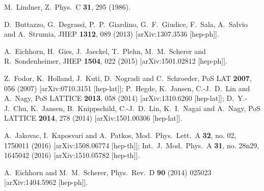 \documentclass[aps,prd,11pt,tightenlines,superscriptaddress,nofootinbib,preprintnumbers,notitlepage]{revtex4-1}
\begin{document}
\begin{thebibliography}{99}
  M.~Lindner,
  Z.\ Phys.\ C {\bf 31}, 295 (1986).

  D.~Buttazzo, G.~Degrassi, P.~P.~Giardino, G.~F.~Giudice, F.~Sala, A.~Salvio and A.~Strumia,
  JHEP {\bf 1312}, 089 (2013)
  [arXiv:1307.3536 [hep-ph]].

  A.~Eichhorn, H.~Gies, J.~Jaeckel, T.~Plehn, M.~M.~Scherer and R.~Sondenheimer,
  JHEP {\bf 1504}, 022 (2015)
  [arXiv:1501.02812 [hep-ph]].

  Z.~Fodor, K.~Holland, J.~Kuti, D.~Nogradi and C.~Schroeder,
  PoS LAT {\bf 2007}, 056 (2007)
  [arXiv:0710.3151 [hep-lat]];
  P.~Hegde, K.~Jansen, C.-J.~D.~Lin and A.~Nagy,
  PoS LATTICE {\bf 2013}, 058 (2014)
  [arXiv:1310.6260 [hep-lat]];
  D.~Y.-J.~Chu, K.~Jansen, B.~Knippschild, C.-J.~D.~Lin, K.~I.~Nagai and A.~Nagy,
  PoS LATTICE {\bf 2014}, 278 (2014)
  [arXiv:1501.00306 [hep-lat]].
  
  A.~Jakovac, I.~Kaposvari and A.~Patkos,
  Mod.\ Phys.\ Lett.\ A {\bf 32}, no. 02, 1750011 (2016)
  [arXiv:1508.06774 [hep-th]]; %
  Int.\ J.\ Mod.\ Phys.\ A {\bf 31}, no. 28n29, 1645042 (2016)
  [arXiv:1510.05782 [hep-th]].

  A.~Eichhorn and M.~M.~Scherer,
  Phys.\ Rev.\ D {\bf 90} (2014) 025023
  [arXiv:1404.5962 [hep-ph]].
  

\end{thebibliography}
\end{document}
